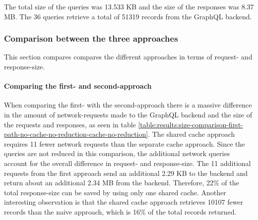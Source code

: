 \documentclass[MSE,Master,english]{twbook}%
\begin{document}

\fi

The total size of the queries was 13.533 KB and the size of the responses was 8.37 MB. The 36 queries retrieve a total of 51319 records from the GraphQL backend.

\subsubsection{Comparison between the three approaches}

This section compares compares the different approaches in terms of request- and response-size.

\paragraph{Comparing the first- and second-approach}

When comparing the first- with the second-approach there is a massive difference in the amount of network-requests made to the GraphQL backend and the size of the requests and responses, as seen in table \ref{table:results:size-comparison-first-path-no-cache-no-reduction-cache-no-reduction}. The shared cache approach requires 11 fewer network requests than the separate cache approach. Since the queries are not reduced in this comparison, the additional network queries account for the overall difference in request- and response-size. The 11 additional requests from the first approach send an additional 2.29 KB to the backend and return about an additional 2.34 MB from the backend. Therefore, 22\% of the total response-size can be saved by using only one shared cache. Another interesting observation is that the shared cache approach retrieves 10107 fewer records than the naive approach, which is 16\% of the total records returned.
\end{document}
